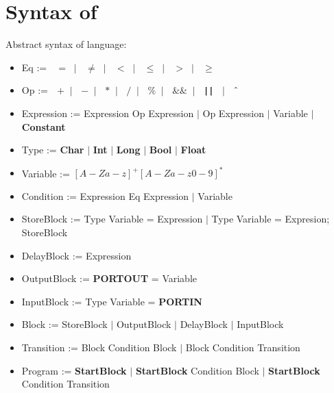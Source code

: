 \section{Syntax of \plcchart}
\label{sec:statechartsyn}

Abstract syntax of \plcchart language:
\begin{definition}
\plcchart

\begin{itemize}
	\item Eq := $\;$ \boldmath$=$\unboldmath $\; \mid \;$ \boldmath$\neq$\unboldmath $\; \mid \;$ \boldmath$<$\unboldmath $\; \mid \;$ \boldmath$\leq$\unboldmath $\; \mid \;$ \boldmath$>$\unboldmath $\; \mid \;$ \boldmath$\geq$\unboldmath	
	\item Op := $\;$ \boldmath$+$\unboldmath $\; \mid \;$ \boldmath$-$\unboldmath $\; \mid \;$ \boldmath$*$\unboldmath $\; \mid \;$ \boldmath$/$\unboldmath $\; \mid \;$ \boldmath$\%$\unboldmath $\; \mid \;$ \boldmath$\&\&$\unboldmath $\; \mid \;$ \textbf{\texttt{||}} $\; \mid \;$ \boldmath$\mathbin{\char`\^}$\unboldmath

	\item Expression := Expression Op Expression $\mid$ Op Expression $\mid$ Variable $\mid$ \textbf{Constant}
	
	\item Type := \textbf{Char} $\mid$ \textbf{Int} $\mid$ \textbf{Long} $\mid$ \textbf{Bool} $\mid$ \textbf{Float}
	\item Variable := $[A-Za-z]^+[A-Za-z0-9]^*$

	\item Condition := Expression Eq Expression $\mid$ Variable

		
	\item StoreBlock := Type Variable = Expression $\mid$ Type Variable = Expresion; StoreBlock
	\item DelayBlock := Expression
	\item OutputBlock := \textbf{PORTOUT} = Variable
	\item InputBlock := Type Variable = \textbf{PORTIN}
	\item Block := StoreBlock $\mid$ OutputBlock $\mid$ DelayBlock $\mid$ InputBlock

	
	\item Transition := Block Condition Block $\mid$ Block Condition Transition
	
	\item Program := \textbf{StartBlock} $\mid$ \textbf{StartBlock} Condition Block $\mid$ \textbf{StartBlock} Condition Transition
\end{itemize}
\end{definition}

